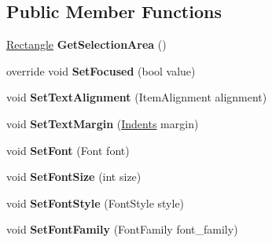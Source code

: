 \subsection*{Public Member Functions}
\begin{DoxyCompactItemize}
\item 
\mbox{\label{class_space_v_i_l_1_1_text_edit_a4c719b16606fcd2bea0bf6eba48c96d9}} 
\mbox{\hyperlink{class_space_v_i_l_1_1_rectangle}{Rectangle}} {\bfseries Get\+Selection\+Area} ()
\item 
\mbox{\label{class_space_v_i_l_1_1_text_edit_ae1e3ae4bf8cdb7252461ae0180c68277}} 
override void {\bfseries Set\+Focused} (bool value)
\item 
\mbox{\label{class_space_v_i_l_1_1_text_edit_aa2aec324bfd907c8aec2e42653cf7760}} 
void {\bfseries Set\+Text\+Alignment} (Item\+Alignment alignment)
\item 
\mbox{\label{class_space_v_i_l_1_1_text_edit_ae6becf5c66378a5bbe93c56418388435}} 
void {\bfseries Set\+Text\+Margin} (\mbox{\hyperlink{struct_space_v_i_l_1_1_decorations_1_1_indents}{Indents}} margin)
\item 
\mbox{\label{class_space_v_i_l_1_1_text_edit_adcedbbb6639b4c10492f28a2e8c2b455}} 
void {\bfseries Set\+Font} (Font font)
\item 
\mbox{\label{class_space_v_i_l_1_1_text_edit_a2c94ff9f468ae30e96a055dc21ce90b7}} 
void {\bfseries Set\+Font\+Size} (int size)
\item 
\mbox{\label{class_space_v_i_l_1_1_text_edit_aed1b2590c147f94a96b1658d6586df09}} 
void {\bfseries Set\+Font\+Style} (Font\+Style style)
\item 
\mbox{\label{class_space_v_i_l_1_1_text_edit_a9dd084e4d6b861ed779fa871e9a84d18}} 
void {\bfseries Set\+Font\+Family} (Font\+Family font\+\_\+family)
\item 
\mbox{\label{class_space_v_i_l_1_1_text_edit_aa2c109c54e313de6327a0ac406ac4ec3}} 

\end{DoxyCompactItemize}
